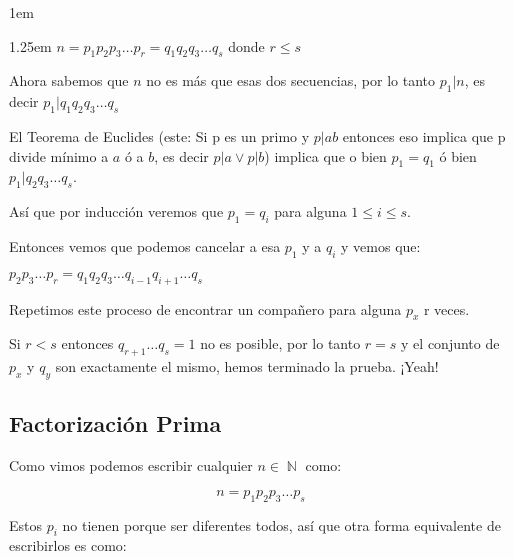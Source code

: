 \documentclass[12pt]{report}                                    %
\newenvironment{Indentation}[1][0.75em]                         %
    {\begin{adjustwidth}{#1}{}}                                     %
    {\end{adjustwidth}}                                             %
\newenvironment{SmallIndentation}[1][0.75em]                    %
    {\begin{adjustwidth}{#1}{}\begin{footnotesize}}                 %
    {\end{footnotesize}\end{adjustwidth}}                           %
\DeclareMathOperator \Naturals  {\mathbb{N}}                     %
\begin{document}
\begin{SmallIndentation}[1em]
\begin{Indentation}[1.25em]
                $n=p_1p_2p_3\dots p_r = q_1q_2q_3\dots q_s$ donde $r \leq s$

                Ahora sabemos que $n$ no es más que esas dos secuencias, por 
                lo tanto $p_1|n$, es decir $p_1|q_1q_2q_3\dots q_s$

                El Teorema de Euclides (este: Si p es un primo y $p|ab$ entonces
                eso implica que p divide mínimo a $a$ ó a $b$, es decir
                $p|a \lor p|b$) implica que o bien $p_1=q_1$ ó bien
                $p_1|q_2q_3\dots q_s$.

                Así que por inducción veremos que $p_1=q_i$ para alguna
                $1 \leq i \leq s$.

                Entonces vemos que podemos cancelar a esa $p_1$ y a $q_i$ y vemos
                que:

                $p_2p_3\dots p_r = q_1q_2q_3\dots q_{i-1}q_{i+1} \dots q_s$

                Repetimos este proceso de encontrar un compañero para alguna $p_x$
                r veces.

                Si $r < s$ entonces $q_{r+1} \dots q_s = 1$ no es posible,
                por lo tanto $r=s$ y el conjunto de $p_x$ y $q_y$ son exactamente
                el mismo, hemos terminado la prueba. ¡Yeah!



            \end{Indentation}
            
        \end{SmallIndentation}



        \clearpage
        \subsection{Factorización Prima}

            Como vimos podemos escribir cualquier $n \in \Naturals$ como:

            \begin{equation}
                n = p_1 p_2 p_3 \dots p_s
            \end{equation}

            Estos $p_i$ no tienen porque ser diferentes todos, así que 
            otra forma equivalente de escribirlos es como:
\end{document}
